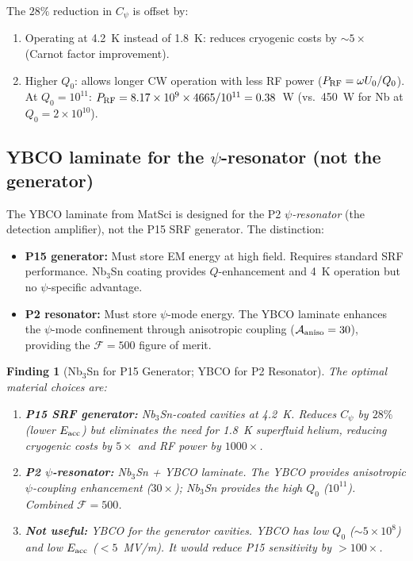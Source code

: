 \documentclass[11pt]{article}
\newtheorem{finding}{Finding}
\newcommand{\ee}[1]{\times 10^{#1}}
\begin{document}
The $28\%$ reduction in $C_\psi$ is offset by:
\begin{enumerate}
\item Operating at 4.2~K instead of 1.8~K: reduces cryogenic costs
by $\sim 5\times$ (Carnot factor improvement).
\item Higher $Q_0$: allows longer CW operation with less RF power
($P_{\rm RF} = \omega U_0/Q_0$). At $Q_0 = 10^{11}$:
$P_{\rm RF} = 8.17\ee{9} \times 4665/10^{11} = 0.38$~W
(vs.\ 450~W for Nb at $Q_0 = 2\ee{10}$).
\end{enumerate}

\subsection{YBCO laminate for the $\psi$-resonator (not the generator)}

The YBCO laminate from MatSci is designed for the P2
\textit{$\psi$-resonator} (the detection amplifier), not the P15
SRF generator. The distinction:

\begin{itemize}
\item \textbf{P15 generator:} Must store EM energy at high field.
Requires standard SRF performance. Nb$_3$Sn coating provides
$Q$-enhancement and 4~K operation but no $\psi$-specific advantage.

\item \textbf{P2 resonator:} Must store $\psi$-mode energy.
The YBCO laminate enhances the $\psi$-mode confinement through
anisotropic coupling ($\mathcal{A}_{\rm aniso} = 30$),
providing the $\mathcal{F} = 500$ figure of merit.
\end{itemize}

\begin{finding}[Nb$_3$Sn for P15 Generator; YBCO for P2 Resonator]
\label{find:materials}
The optimal material choices are:
\begin{enumerate}
\item \textbf{P15 SRF generator:} Nb$_3$Sn-coated cavities at 4.2~K.
Reduces $C_\psi$ by $28\%$ (lower $E_{\rm acc}$) but eliminates
the need for 1.8~K superfluid helium, reducing cryogenic costs
by $5\times$ and RF power by $1000\times$.

\item \textbf{P2 $\psi$-resonator:} Nb$_3$Sn + YBCO laminate.
The YBCO provides anisotropic $\psi$-coupling enhancement
($30\times$); Nb$_3$Sn provides the high $Q_0$ ($10^{11}$).
Combined $\mathcal{F} = 500$.

\item \textbf{Not useful:} YBCO for the generator cavities.
YBCO has low $Q_0$ ($\sim 5\ee{8}$) and low $E_{\rm acc}$
($< 5$~MV/m). It would reduce P15 sensitivity by $> 100\times$.
\end{enumerate}
\end{finding}
\end{document}
